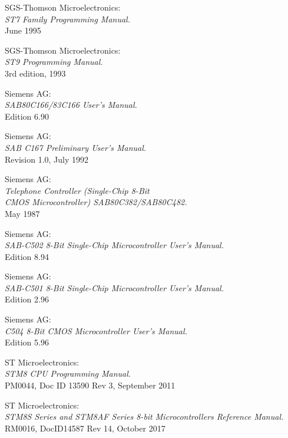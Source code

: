  SGS-Thomson Microelectronics: \\
                 {\em ST7 Family Programming Manual.\/} \\
                 June 1995

 SGS-Thomson Microelectronics: \\
               {\em ST9 Programming Manual.\/} \\
               3rd edition, 1993

 Siemens AG: \\
                  {\em SAB80C166/83C166 User's Manual.\/} \\
                  Edition 6.90

 Siemens AG: \\
                  {\em SAB C167 Preliminary User's Manual.\/} \\
                  Revision 1.0, July 1992

 Siemens AG: \\
                  {\em Telephone Controller (Single-Chip 8-Bit \\
                  CMOS Microcontroller) SAB80C382/SAB80C482.\/}\\
                  May 1987

 Siemens AG: \\
                  {\em SAB-C502 8-Bit Single-Chip Microcontroller User's
                   Manual.\/} \\
                  Edition 8.94

 Siemens AG: \\
                  {\em SAB-C501 8-Bit Single-Chip Microcontroller User's
                   Manual.\/} \\
                  Edition 2.96

 Siemens AG: \\
                  {\em C504 8-Bit CMOS Microcontroller User's Manual.\/} \\
                  Edition 5.96

 ST Microelectronics: \\
                  {\em STM8 CPU Programming Manual.\/} \\
                  PM0044, Doc ID 13590 Rev 3, September 2011

 ST Microelectronics: \\
                  {\em STM8S Series and STM8AF Series 8-bit Microcontrollers Reference Manual.\/} \\
                  RM0016, DocID14587 Rev 14, October 2017

